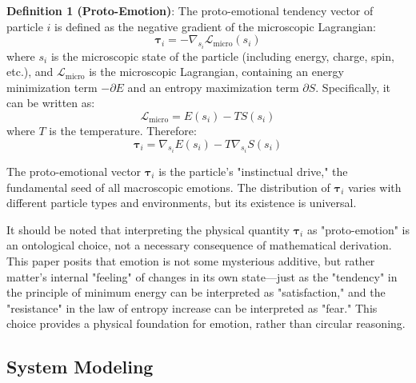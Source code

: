 \documentclass[12pt,a4paper]{article}
\theoremstyle{plain}
\newcommand{\ve}[1]{\bm{#1}}                    %
\begin{document}
\textbf{Definition 1 (Proto-Emotion)}: The proto-emotional tendency vector of particle $i$ is defined as the negative gradient of the microscopic Lagrangian:
\begin{equation}
\ve{\tau}_i = -\nabla_{s_i} \mathcal{L}_{\text{micro}}(s_i)
\end{equation}
where $s_i$ is the microscopic state of the particle (including energy, charge, spin, etc.), and $\mathcal{L}_{\text{micro}}$ is the microscopic Lagrangian, containing an energy minimization term $- \partial E$ and an entropy maximization term $\partial S$. Specifically, it can be written as:
\begin{equation}
\mathcal{L}_{\text{micro}} = E(s_i) - T S(s_i)
\end{equation}
where $T$ is the temperature. Therefore:
\begin{equation}
\ve{\tau}_i = \nabla_{s_i} E(s_i) - T \nabla_{s_i} S(s_i)
\end{equation}

The proto-emotional vector $\ve{\tau}_i$ is the particle's "instinctual drive," the fundamental seed of all macroscopic emotions. The distribution of $\ve{\tau}_i$ varies with different particle types and environments, but its existence is universal.

It should be noted that interpreting the physical quantity $\ve{\tau}_i$ as "proto-emotion" is an ontological choice, not a necessary consequence of mathematical derivation. This paper posits that emotion is not some mysterious additive, but rather matter's internal "feeling" of changes in its own state—just as the "tendency" in the principle of minimum energy can be interpreted as "satisfaction," and the "resistance" in the law of entropy increase can be interpreted as "fear." This choice provides a physical foundation for emotion, rather than circular reasoning.

\subsection{System Modeling}
\end{document}
